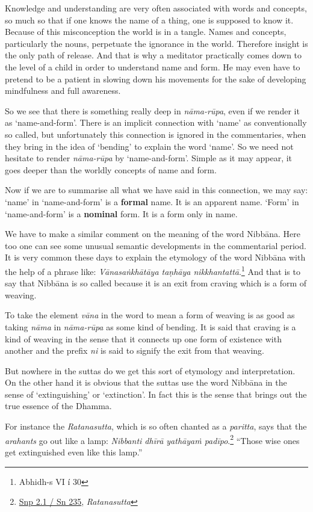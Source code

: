 Knowledge and understanding are very often associated with words and concepts, so much so that if one knows the name of a thing, one is supposed to know it. Because of this misconception the world is in a tangle. Names and concepts, particularly the nouns, perpetuate the ignorance in the world. Therefore insight is the only path of release. And that is why a meditator practically comes down to the level of a child in order to understand name and form. He may even have to pretend to be a patient in slowing down his movements for the sake of developing mindfulness and full awareness.

So we see that there is something really deep in \emph{nāma-rūpa}, even if we render it as `name-and-form'. There is an implicit connection with `name' as conventionally so called, but unfortunately this connection is ignored in the commentaries, when they bring in the idea of `bending' to explain the word `name'. So we need not hesitate to render \emph{nāma-rūpa} by `name-and-form'. Simple as it may appear, it goes deeper than the worldly concepts of name and form.

Now if we are to summarise all what we have said in this connection, we may say: `name' in `name-and-form' is a \textbf{formal} name. It is an apparent name. `Form' in `name-and-form' is a \textbf{nominal} form. It is a form only in name.

We have to make a similar comment on the meaning of the word Nibbāna. Here too one can see some unusual semantic developments in the commentarial period. It is very common these days to explain the etymology of the word Nibbāna with the help of a phrase like: \emph{Vānasaṅkhātāya taṇhāya nikkhantattā}.\footnote{Abhidh-s VI í 30} And that is to say that Nibbāna is so called because it is an exit from craving which is a form of weaving.

To take the element \emph{vāna} in the word to mean a form of weaving is as good as taking \emph{nāma} in \emph{nāma-rūpa} as some kind of bending. It is said that craving is a kind of weaving in the sense that it connects up one form of existence with another and the prefix \emph{ni} is said to signify the exit from that weaving.

But nowhere in the suttas do we get this sort of etymology and interpretation. On the other hand it is obvious that the suttas use the word Nibbāna in the sense of `extinguishing' or `extinction'. In fact this is the sense that brings out the true essence of the Dhamma.

For instance the \emph{Ratanasutta}, which is so often chanted as a \emph{paritta}, says that the \emph{arahants} go out like a lamp: \emph{Nibbanti dhīrā yathāyaṁ padīpo}.\footnote{\href{https://suttacentral.net/snp2.1/pli/ms}{Snp 2.1 / Sn 235}, \emph{Ratanasutta}} ``Those wise ones get extinguished even like this lamp.''

